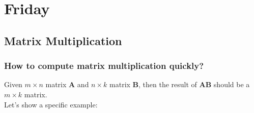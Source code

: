 

\section{Friday}

\subsection{Matrix Multiplication}
\subsubsection{How to compute matrix multiplication quickly?}
\enlargethispage{1cm}
Given $m\times n$ matrix $\bm A$ and $n\times k$ matrix $\bm B$, then the result of $\bm{AB}$ should be a $m\times k$ matrix.\\
Let’s show a specific example:
